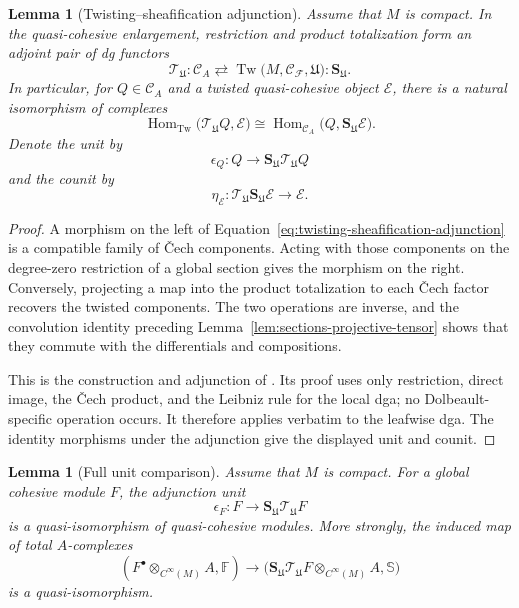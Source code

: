 \documentclass[12pt]{amsart}
\newtheorem{lem}[thm]{Lemma}
\theoremstyle{definition}
\theoremstyle{remark}
\numberwithin{equation}{section}
\newcommand{\CF}{{\mathcal F}}
\newcommand{\A}{{A}}
\newcommand{\1}{{\mathbb{1}}}
\newcommand{\Hom}{\operatorname{Hom}}
\begin{document}
\begin{lem}[Twisting--sheafification adjunction]
\label{lem:twisting-sheafification-adjunction}
Assume that $M$ is compact.  In the quasi-cohesive enlargement,
restriction and product
totalization form an adjoint pair of dg functors
\[
 \mathcal T_{\mathfrak U}:
 \mathcal C_{\A}
 \rightleftarrows
 \operatorname{Tw}
 \bigl(M,\mathcal C_{\CF},\mathfrak U\bigr):
 \mathbf S_{\mathfrak U}.
\]
In particular, for $Q\in\mathcal C_{\A}$ and a twisted
quasi-cohesive object $\mathcal E$, there is a natural isomorphism of
complexes
\begin{equation}\label{eq:twisting-sheafification-adjunction}
 \Hom_{\operatorname{Tw}}
 \bigl(\mathcal T_{\mathfrak U}Q,\mathcal E\bigr)
 \cong
 \Hom_{\mathcal C_{\A}}
 \bigl(Q,\mathbf S_{\mathfrak U}\mathcal E\bigr).
\end{equation}
Denote the unit by
\[
 \epsilon_Q:Q\longrightarrow
 \mathbf S_{\mathfrak U}\mathcal T_{\mathfrak U}Q
\]
and the counit by
\[
 \eta_{\mathcal E}:
 \mathcal T_{\mathfrak U}\mathbf S_{\mathfrak U}\mathcal E
 \longrightarrow\mathcal E.
\]
\end{lem}

\begin{proof}
A morphism on the left of
Equation~\eqref{eq:twisting-sheafification-adjunction} is a compatible
family of \v{C}ech components.  Acting with those components on the
degree-zero restriction of a global section gives the morphism on the
right.  Conversely, projecting a map into the product totalization to
each \v{C}ech factor recovers the twisted components.  The two
operations are inverse, and the convolution identity preceding
Lemma~\ref{lem:sections-projective-tensor} shows that they commute
with the differentials and compositions.

This is the construction and adjunction of
\cite[Proposition 3.4]{Wei23}.  Its proof uses only restriction,
direct image, the \v{C}ech product, and the Leibniz rule for the local
dga; no Dolbeault-specific operation occurs.  It therefore applies
verbatim to the leafwise dga.  The identity morphisms under the
adjunction give the displayed unit and counit.
\end{proof}

\begin{lem}[Full unit comparison]\label{lem:full-descent-unit}
Assume that $M$ is compact.  For a global cohesive module $F$, the
adjunction unit
\[
 \epsilon_F:
 F\longrightarrow
 \mathbf S_{\mathfrak U}\mathcal T_{\mathfrak U}F
\]
is a quasi-isomorphism of quasi-cohesive modules.  More strongly, the
induced map of total $\A$-complexes
\[
 (F^\bullet\otimes_{C^\infty(M)}\A,\mathbb F)
 \longrightarrow
 \bigl(
  \mathbf S_{\mathfrak U}\mathcal T_{\mathfrak U}F
  \otimes_{C^\infty(M)}\A,\mathbb S
 \bigr)
\]
is a quasi-isomorphism.
\end{lem}
\end{document}
